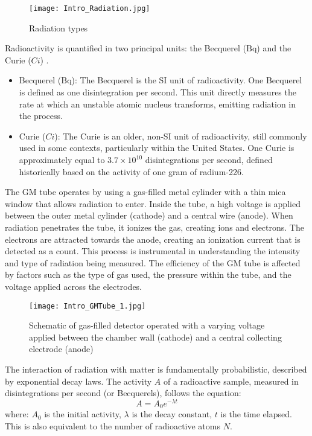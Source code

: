 \documentclass[11pt]{article}
\begin{document}
	\begin{figure}[htbp]
		\centering
		\texttt{[image: Intro\_Radiation.jpg]}
		\caption{Radiation types}
		\label{fig:Intro_Radiation}
	\end{figure}
	
	Radioactivity is quantified in two principal units: the Becquerel ($\unit{\becquerel}$) and the Curie ($\unit{Ci}$) \cite{manual}.
	\begin{itemize}
		\item Becquerel ($\unit{\becquerel}$): The Becquerel is the SI unit of radioactivity. One Becquerel is defined as one disintegration per second. This unit directly measures the rate at which an unstable atomic nucleus transforms, emitting radiation in the process.
		\item Curie ($\unit{Ci}$): The Curie is an older, non-SI unit of radioactivity, still commonly used in some contexts, particularly within the United States. One Curie is approximately equal to \(3.7 \times 10^{10}\) disintegrations per second, defined historically based on the activity of one gram of radium-226.
	\end{itemize}
	
	The GM tube operates by using a gas-filled metal cylinder with a thin mica window that allows radiation to enter. Inside the tube, a high voltage is applied between the outer metal cylinder (cathode) and a central wire (anode). When radiation penetrates the tube, it ionizes the gas, creating ions and electrons. The electrons are attracted towards the anode, creating an ionization current that is detected as a count. This process is instrumental in understanding the intensity and type of radiation being measured. The efficiency of the GM tube is affected by factors such as the type of gas used, the pressure within the tube, and the voltage applied across the electrodes.
	
	\begin{figure}[htbp]
		\centering
		\texttt{[image: Intro\_GMTube\_1.jpg]}
		\caption{\centering Schematic of gas-filled detector operated with a varying voltage applied between the chamber wall (cathode) and a central collecting electrode (anode) \cite{martin_physics_2006}}
		\label{fig:Intro_GM_Tube}
	\end{figure}
	
	The interaction of radiation with matter is fundamentally probabilistic, described by exponential decay laws. The activity \( A \) of a radioactive sample, measured in disintegrations per second (or Becquerels), follows the equation:
	\begin{equation}
		A = A_0 e^{-\lambda t}
	\end{equation}
	where: \( A_0 \) is the initial activity, \( \lambda \) is the decay constant, \( t \) is the time elapsed. This is also equivalent to the number of radioactive atoms \( N \).
	
\end{document}
